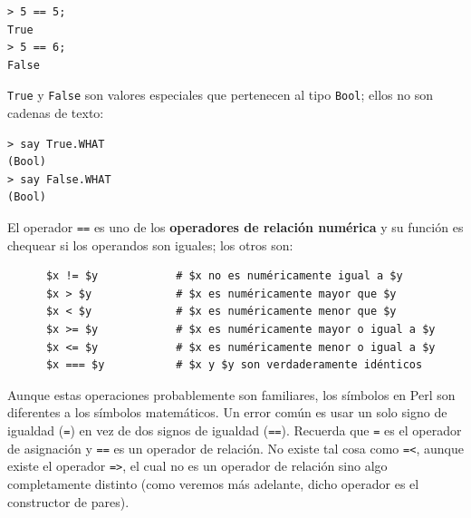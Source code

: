 \begin{lstlisting}
> 5 == 5;
True
> 5 == 6;
False
\end{lstlisting}
%
{\tt True} y {\tt False} son valores especiales
que pertenecen al tipo {\tt Bool}; ellos no son
cadenas de texto:

\begin{lstlisting}
> say True.WHAT
(Bool)
> say False.WHAT
(Bool)
\end{lstlisting}
%
El operador {\tt ==} es uno de los {\bf operadores de relación
numérica} y su función es chequear si los operandos son 
iguales; los otros son:

\begin{lstlisting}
      $x != $y            # $x no es numéricamente igual a $y
      $x > $y             # $x es numéricamente mayor que $y
      $x < $y             # $x es numéricamente menor que $y
      $x >= $y            # $x es numéricamente mayor o igual a $y
      $x <= $y            # $x es numéricamente menor o igual a $y
      $x === $y           # $x y $y son verdaderamente idénticos
\end{lstlisting}
\ifplastex \else
{}
\fi
Aunque estas operaciones probablemente son familiares, los
símbolos en Perl son diferentes a los símbolos matemáticos.
Un error común es usar un solo signo de igualdad ({\tt =}) en vez de 
dos signos de igualdad ({\tt ==}). Recuerda que {\tt =} es el
operador de asignación y {\tt ==} es un operador de relación.
No existe tal cosa como {\tt =<}, aunque existe el operador {\tt =>},
el cual no es un operador de relación sino algo completamente
distinto (como veremos más adelante, dicho operador es el constructor 
de pares). 
\ifplastex \else
{}
\fi

